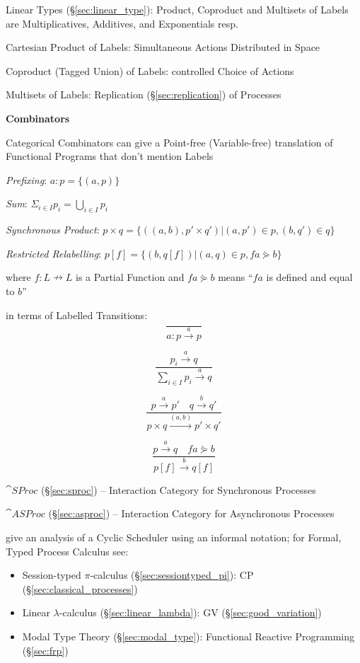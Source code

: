 Linear Types (\S\ref{sec:linear_type}): Product, Coproduct and
Multisets of Labels are Multiplicatives, Additives, and Exponentials
resp.

Cartesian Product of Labels: Simultaneous Actions Distributed in Space

Coproduct (Tagged Union) of Labels: controlled Choice of Actions

Multisets of Labels: Replication (\S\ref{sec:replication}) of
Processes


\textbf{Combinators}

Categorical Combinators can give a Point-free (Variable-free)
translation of Functional Programs that don't mention Labels

\emph{Prefixing}: $a:p = \{(a,p)\}$

\emph{Sum}: $\Sigma_{i \in I} p_i = \bigcup_{i \in I} p_i$

\emph{Synchronous Product}:
$p \times q = \{((a,b), p' \times q') | (a,p') \in p, (b,q') \in q\}$

\emph{Restricted Relabelling}:
$p[f] = \{(b,q[f]) | (a,q) \in p, f a \curlyeqsucc b\}$

where $f : L \nrightarrow L$ is a Partial Function and $f a
\curlyeqsucc b$ means ``$f a$ is defined and equal to $b$''

in terms of Labelled Transitions:
\[
  \frac{}
  {a : p \xrightarrow{a} p}
\]

\[
  \frac{p_i \xrightarrow{a} q}
  {\sum_{i \in I} p_i \xrightarrow{a} q}
\]

\[
  \frac{p \xrightarrow{a} p' \quad q \xrightarrow{b} q'}
  {p \times q \xrightarrow{(a,b)} p' \times q'}
\]

\[
  \frac{p \xrightarrow{a} q \quad f a \curlyeqsucc b}
  {p[f] \xrightarrow{b} q[f]}
\]


\asterism


$\cat{SProc}$ (\S\ref{sec:sproc}) -- Interaction Category for
Synchronous Processes

$\cat{ASProc}$ (\S\ref{sec:asproc}) -- Interaction Category for
Asynchronous Processes

\fist \cite{abramsky-gay-nagarajan96} give an analysis of a Cyclic
Scheduler using an informal notation; for Formal, Typed Process
Calculus see:
\begin{itemize}
  \item Session-typed $\pi$-calculus
    (\S\ref{sec:sessiontyped_pi}): CP
    (\S\ref{sec:classical_processes})
  \item Linear $\lambda$-calculus (\S\ref{sec:linear_lambda}): GV
    (\S\ref{sec:good_variation})
  \item Modal Type Theory (\S\ref{sec:modal_type}): Functional
    Reactive Programming (\S\ref{sec:frp})
\end{itemize}



